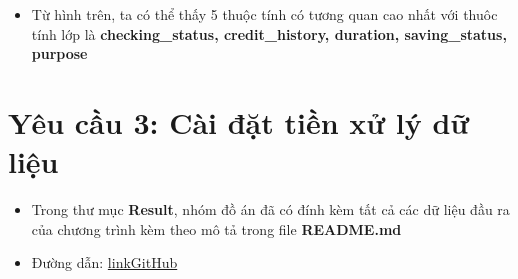 \documentclass[a4paper, 12pt]{article}
\begin{document}
\begin{itemize}
    \item Từ hình trên, ta có thể thấy 5 thuộc tính có tương quan cao nhất với thuôc tính lớp là \textbf{checking\_status, credit\_history, duration, saving\_status, purpose}
\end{itemize}

\clearpage

\section{Yêu cầu 3: Cài đặt tiền xử lý dữ liệu}
\begin{itemize}
    \item Trong thư mục \textbf{Result}, nhóm đồ án đã có đính kèm tất cả các dữ liệu đầu ra của chương trình kèm theo mô tả trong file \textbf{README.md}
    \item Đường dẫn: \url{linkGitHub}
\end{itemize}
\end{document}
